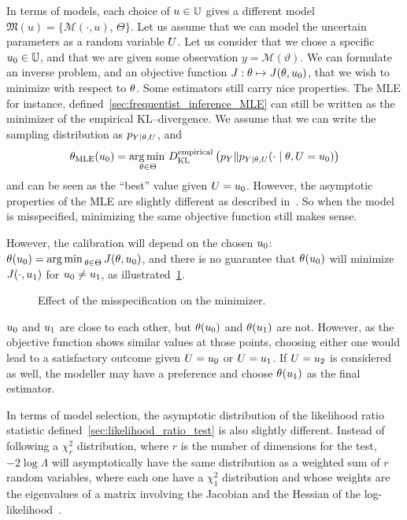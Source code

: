 \documentclass[../../Main_ManuscritThese.tex]{subfiles}
\newcommand\imgpath{/home/victor/acadwriting/Manuscrit/Text/Chapter2/img/}
\begin{document}

In terms of models, each choice of $\uu \in \Uspace$ gives a different model $\mathfrak{M}(u) = \{\mathcal{M}(\cdot, u),\,\Theta\}$. Let us assume that we can model the uncertain parameters as a random variable $\UU$.
Let us consider that we chose a specific $\uu_0 \in \Uspace$, and that we are given some observation $y=\mathscr{M}(\vartheta)$. We can formulate an inverse problem, and an objective function $J:\kk \mapsto J(\kk,\uu_0)$, that we wish to minimize with respect to $\kk$.
Some estimators still carry nice properties. The MLE for instance, defined~\cref{sec:frequentist_inference_MLE} can still be written as the minimizer of the empirical KL--divergence. We assume that we can write the sampling distribution as $p_{Y \mid \KK, \UU}$, and
\begin{equation}
  \estimtxt{\theta}{MLE}(\uu_0)=  \argmin_{\kk \in \Kspace}\DKL[empirical]{p_Y}{p_{Y \mid \theta, \UU}(\cdot \mid \theta, \UU=\uu_0)}
\end{equation}
and can be seen as the ``best'' value given $\UU=\uu_0$. However, the asymptotic properties of the MLE are slightly different as described in~\cite{white_maximum_1982}.
So when the model is misspecified, minimizing the same objective function still makes sense.

However, the calibration will depend on the chosen $\uu_0$: $\estimtxt{\theta}{}(\uu_0) = \argmin_{\theta \in \Theta} J(\theta,\uu_0)$, and there is no guarantee that $\estimtxt{\theta}{}(\uu_0)$ will minimize $J(\cdot, \uu_1)$ for $\uu_0 \neq \uu_1$, as illustrated~\cref{fig:minimizer_misspecification}.

\begin{figure}[ht]
  \centering
  
  \caption{Effect of the misspecification on the minimizer.}
  \label{fig:minimizer_misspecification}
\end{figure}

$\uu_0$ and $\uu_1$ are close to each other, but ${\kk}(\uu_0)$ and ${\kk}(\uu_1)$ are not. However, as the objective function shows similar values at those points, choosing either one would lead to a satisfactory outcome given $\UU = \uu_0$ or $\UU=\uu_1$. If $\UU = \uu_2$ is considered as well, the modeller may have a preference and choose $\estimtxt{\kk}{}(\uu_1)$ as the final estimator.

In terms of model selection, the asymptotic distribution of the
likelihood ratio statistic defined~\cref{sec:likelihood_ratio_test} is
also slightly different. Instead of following a $\chi^2_{r}$
distribution, where $r$ is the number of dimensions for the test,
$-2\log \Lambda$ will asymptotically have the same distribution as a
weighted sum of $r$ random variables, where each one have a $\chi^2_1$
distribution and whose weights are the eigenvalues of a matrix
involving the Jacobian and the Hessian of the
log-likelihood~\cite{kent_robust_1982}.
\end{document}
